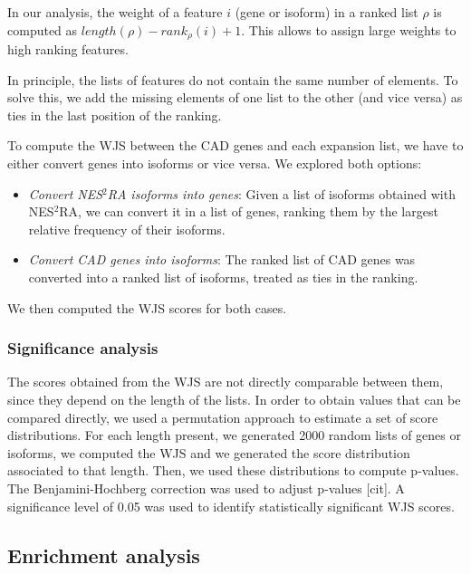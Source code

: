 \documentclass[fleqn,10pt]{SelfArx} %
\begin{document}
In our analysis, the weight of a feature $i$ (gene or isoform) in a ranked list $\rho$ is computed as $length(\rho) - rank_{\rho}(i) + 1$. This allows to assign large weights to high ranking features.

In principle, the lists of features do not contain the same number of elements. To solve this, we add the missing elements of one list to the other (and vice versa) as ties in the last position of the ranking.

To compute the WJS between the CAD genes and each expansion list, we have to either convert genes into isoforms or vice versa. We explored both options:

\begin{itemize}[leftmargin=*]
	\item \textit{Convert NES$^2$RA isoforms into genes}: Given a list of isoforms obtained with NES$^2$RA, we can convert it in a list of genes, ranking them by the largest relative frequency of their isoforms.
	\item \textit{Convert CAD genes into isoforms}: The ranked list of CAD genes was converted into a ranked list of isoforms, treated as ties in the ranking.
\end{itemize}

We then computed the WJS scores for both cases.

\subsubsection*{Significance analysis} 

The scores obtained from the WJS are not directly comparable between them, since they depend on the length of the lists. In order to obtain values that can be compared directly, we used a permutation approach to estimate a set of score distributions. For each length present, we generated 2000 random lists of genes or isoforms, we computed the WJS and we generated the score distribution associated to that length. Then, we used these distributions to compute p-values. The Benjamini-Hochberg correction was used to adjust p-values [cit]. A significance level of 0.05 was used to identify statistically significant WJS scores. 

\subsection*{Enrichment analysis}
\end{document}
